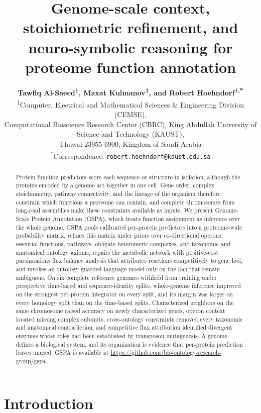 \documentclass[10pt,twocolumn]{article}
\title{\textbf{\sffamily Genome-scale context, stoichiometric refinement, and neuro-symbolic reasoning for proteome function annotation}}
\author{
  \textbf{Tawfiq Al-Saeed\textsuperscript{1}, Maxat Kulmanov\textsuperscript{1}, and Robert Hoehndorf\textsuperscript{1,*}}\\[4pt]
  \small \textsuperscript{1}Computer, Electrical and Mathematical Sciences \& Engineering Division (CEMSE),\\
  \small Computational Bioscience Research Center (CBRC), King Abdullah University of Science and Technology (KAUST),\\
  \small Thuwal 23955-6900, Kingdom of Saudi Arabia\\[2pt]
  \small \textsuperscript{*}Correspondence: \texttt{robert.hoehndorf@kaust.edu.sa}
}
\date{}
\begin{document}
\maketitle

\begin{abstract}
\noindent
Protein function predictors score each sequence or structure in isolation, although the proteins encoded by a genome act together in one cell. Gene order, complex stoichiometry, pathway connectivity, and the lineage of the organism therefore constrain which functions a proteome can contain, and complete chromosomes from long-read assemblies make these constraints available as inputs. We present Genome-Scale Protein Annotation (GSPA), which treats function assignment as inference over the whole genome. GSPA pools calibrated per-protein predictors into a proteome-wide probability matrix, refines this matrix under priors over co-directional operons, essential functions, pathways, obligate heteromeric complexes, and taxonomic and anatomical ontology axioms, repairs the metabolic network with positive-cost parsimonious flux balance analysis that attributes reactions competitively to gene loci, and invokes an ontology-guarded language model only on the loci that remain ambiguous. On six complete reference genomes withheld from training under prospective time-based and sequence-identity splits, whole-genome inference improved on the strongest per-protein integrator on every split, and its margin was larger on every homology split than on the time-based splits. Characterized neighbors on the same chromosome raised accuracy on newly characterized genes, operon context located missing complex subunits, cross-ontology constraints removed every taxonomic and anatomical contradiction, and competitive flux attribution identified divergent enzymes whose roles had been established by transposon mutagenesis. A genome defines a biological system, and its organization is evidence that per-protein prediction leaves unused. GSPA is available at \url{https://github.com/bio-ontology-research-group/gspa}.
\end{abstract}

\section{Introduction}
\end{document}
